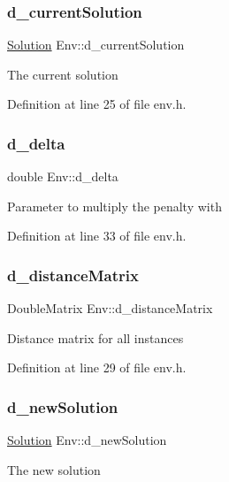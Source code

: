 \subsubsection{\texorpdfstring{d\+\_\+current\+Solution}{d\_currentSolution}}
{\footnotesize\ttfamily \hyperlink{class_solution}{Solution} Env\+::d\+\_\+current\+Solution}

The current solution 

Definition at line 25 of file env.\+h.

\mbox{\label{class_env_a356dd226bf831c283818b459d66224c4}} 
\subsubsection{\texorpdfstring{d\+\_\+delta}{d\_delta}}
{\footnotesize\ttfamily double Env\+::d\+\_\+delta}

Parameter to multiply the penalty with 

Definition at line 33 of file env.\+h.

\mbox{\label{class_env_a2686d42335dbafb9c10ebdbe6362e613}} 
\subsubsection{\texorpdfstring{d\+\_\+distance\+Matrix}{d\_distanceMatrix}}
{\footnotesize\ttfamily Double\+Matrix Env\+::d\+\_\+distance\+Matrix}

Distance matrix for all instances 

Definition at line 29 of file env.\+h.

\mbox{\label{class_env_a6109a75656bf4b55567e57369d7b5aa5}} 
\subsubsection{\texorpdfstring{d\+\_\+new\+Solution}{d\_newSolution}}
{\footnotesize\ttfamily \hyperlink{class_solution}{Solution} Env\+::d\+\_\+new\+Solution}

The new solution 

